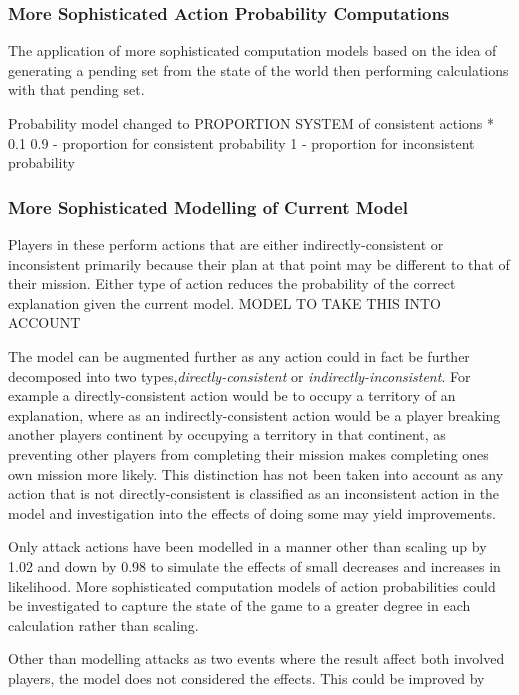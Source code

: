 \documentclass[parskip]{cs4rep}
\begin{document}
\subsubsection{More Sophisticated Action Probability Computations}

The application of more sophisticated computation models based on the idea of generating a pending set from the state of the world then performing calculations with that pending set.

Probability model changed to PROPORTION SYSTEM of consistent actions * 0.1 
0.9 - proportion for consistent probability
1 - proportion for inconsistent probability

\subsubsection{More Sophisticated Modelling of Current Model}

Players in these perform actions that are either indirectly-consistent or inconsistent  primarily because their plan at that point may be different to that of their mission. Either type of action reduces the probability of the correct explanation given the current model. MODEL TO TAKE THIS INTO ACCOUNT

The model can be augmented further as any action could in fact be further decomposed into two types,\textit{directly-consistent} or \textit{indirectly-inconsistent}. For example a directly-consistent action would be to occupy a territory of an explanation, where as an indirectly-consistent action would be a player breaking another players continent by occupying a territory in that continent, as preventing other players from completing their mission makes completing ones own mission more likely. This distinction has not been taken into account as any action that is not directly-consistent is classified as an inconsistent action in the model and investigation into the effects of doing some may yield improvements.

Only attack actions have been modelled in a manner other than scaling up by 1.02 and down by 0.98 to simulate the effects of small decreases and increases in likelihood. More sophisticated computation models of action probabilities could be investigated to capture the state of the game to a greater degree in each calculation rather than scaling.

Other than modelling attacks as two events where the result affect both involved players, the model does not considered the effects. This could be improved by
\end{document}
